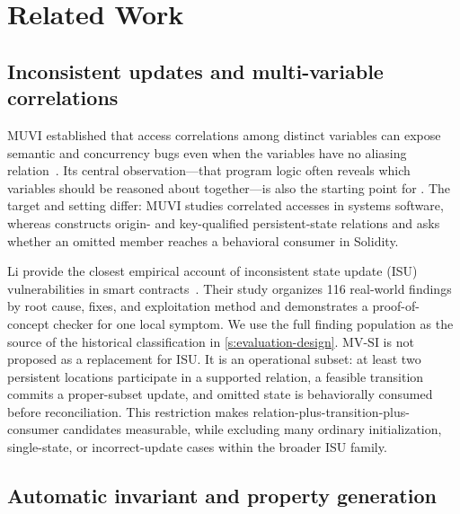 
\section{Related Work}
\label{s:related-work}

\subsection{Inconsistent updates and multi-variable correlations}
\label{s:related-isu}

MUVI established that access correlations among distinct variables can expose semantic and concurrency bugs even when the variables have no aliasing relation~\cite{lu2007muvi}. Its central observation---that program logic often reveals which variables should be reasoned about together---is also the starting point for \sys. The target and setting differ: MUVI studies correlated accesses in systems software, whereas \sys constructs origin- and key-qualified persistent-state relations and asks whether an omitted member reaches a behavioral consumer in Solidity.

Li \etal provide the closest empirical account of inconsistent state update (ISU) vulnerabilities in smart contracts~\cite{li2026understanding}. Their study organizes 116 real-world findings by root cause, fixes, and exploitation method and demonstrates a proof-of-concept checker for one local symptom. We use the full finding population as the source of the historical classification in \autoref{s:evaluation-design}. MV-SI is not proposed as a replacement for ISU. It is an operational subset: at least two persistent locations participate in a supported relation, a feasible transition commits a proper-subset update, and omitted state is behaviorally consumed before reconciliation. This restriction makes relation-plus-transition-plus-consumer candidates measurable, while excluding many ordinary initialization, single-state, or incorrect-update cases within the broader ISU family.

\subsection{Automatic invariant and property generation}
\label{s:related-invariants}

